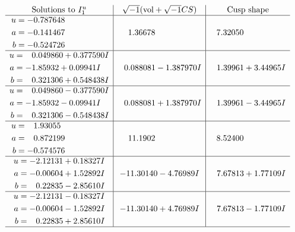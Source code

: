 \documentclass[1p]{elsarticle_modified}
\theoremstyle{definition}
\newcommand{\I}{\sqrt{-1}}
\begin{document}
$$\begin{array}{c|c|c}  
\text{Solutions to }I^u_{1}& \I (\text{vol} + \sqrt{-1}CS) & \text{Cusp shape}\\
 \hline 
\begin{aligned}
u &= -0.787648\phantom{ +0.000000I} \\
a &= -0.141467\phantom{ +0.000000I} \\
b &= -0.524726\phantom{ +0.000000I}\end{aligned}
 & \phantom{-}1.36678\phantom{ +0.000000I} & \phantom{-}7.32050\phantom{ +0.000000I} \\ \hline\begin{aligned}
u &= \phantom{-}0.049860 + 0.377590 I \\
a &= -1.85932 + 0.09941 I \\
b &= \phantom{-}0.321306 + 0.548438 I\end{aligned}
 & \phantom{-}0.088081 - 1.387970 I & \phantom{-}1.39961 + 3.44965 I \\ \hline\begin{aligned}
u &= \phantom{-}0.049860 - 0.377590 I \\
a &= -1.85932 - 0.09941 I \\
b &= \phantom{-}0.321306 - 0.548438 I\end{aligned}
 & \phantom{-}0.088081 + 1.387970 I & \phantom{-}1.39961 - 3.44965 I \\ \hline\begin{aligned}
u &= \phantom{-}1.93055\phantom{ +0.000000I} \\
a &= \phantom{-}0.872199\phantom{ +0.000000I} \\
b &= -0.574576\phantom{ +0.000000I}\end{aligned}
 & \phantom{-}11.1902\phantom{ +0.000000I} & \phantom{-}8.52400\phantom{ +0.000000I} \\ \hline\begin{aligned}
u &= -2.12131 + 0.18327 I \\
a &= -0.00604 + 1.52892 I \\
b &= \phantom{-}0.22835 - 2.85610 I\end{aligned}
 & -11.30140 - 4.76989 I & \phantom{-}7.67813 + 1.77109 I \\ \hline\begin{aligned}
u &= -2.12131 - 0.18327 I \\
a &= -0.00604 - 1.52892 I \\
b &= \phantom{-}0.22835 + 2.85610 I\end{aligned}
 & -11.30140 + 4.76989 I & \phantom{-}7.67813 - 1.77109 I\\
 \hline 
 \end{array}$$\newpage\newpage\renewcommand{\arraystretch}{1}
\end{document}
